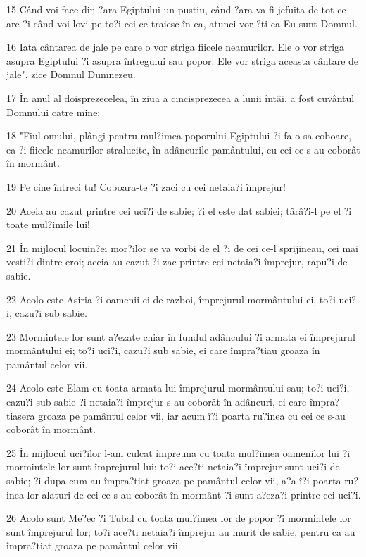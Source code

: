 \par 15 Când voi face din ?ara Egiptului un pustiu, când ?ara va fi jefuita de tot ce are ?i când voi lovi pe to?i cei ce traiesc în ea, atunci vor ?ti ca Eu sunt Domnul.
\par 16 Iata cântarea de jale pe care o vor striga fiicele neamurilor. Ele o vor striga asupra Egiptului ?i asupra întregului sau popor. Ele vor striga aceasta cântare de jale", zice Domnul Dumnezeu.
\par 17 În anul al doisprezecelea, în ziua a cincisprezecea a lunii întâi, a fost cuvântul Domnului catre mine:
\par 18 "Fiul omului, plângi pentru mul?imea poporului Egiptului ?i fa-o sa coboare, ea ?i fiicele neamurilor stralucite, în adâncurile pamântului, cu cei ce s-au coborât în mormânt.
\par 19 Pe cine întreci tu! Coboara-te ?i zaci cu cei netaia?i împrejur!
\par 20 Aceia au cazut printre cei uci?i de sabie; ?i el este dat sabiei; târâ?i-l pe el ?i toate mul?imile lui!
\par 21 În mijlocul locuin?ei mor?ilor se va vorbi de el ?i de cei ce-l sprijineau, cei mai vesti?i dintre eroi; aceia au cazut ?i zac printre cei netaia?i împrejur, rapu?i de sabie.
\par 22 Acolo este Asiria ?i oamenii ei de razboi, împrejurul mormântului ei, to?i uci?i, cazu?i sub sabie.
\par 23 Mormintele lor sunt a?ezate chiar în fundul adâncului ?i armata ei împrejurul mormântului ei; to?i uci?i, cazu?i sub sabie, ei care împra?tiau groaza în pamântul celor vii.
\par 24 Acolo este Elam cu toata armata lui împrejurul mormântului sau; to?i uci?i, cazu?i sub sabie ?i netaia?i împrejur s-au coborât în adâncuri, ei care împra?tiasera groaza pe pamântul celor vii, iar acum î?i poarta ru?inea cu cei ce s-au coborât în mormânt.
\par 25 În mijlocul uci?ilor l-am culcat împreuna cu toata mul?imea oamenilor lui ?i mormintele lor sunt împrejurul lui; to?i ace?ti netaia?i împrejur sunt uci?i de sabie; ?i dupa cum au împra?tiat groaza pe pamântul celor vii, a?a î?i poarta ru?inea lor alaturi de cei ce s-au coborât în mormânt ?i sunt a?eza?i printre cei uci?i.
\par 26 Acolo sunt Me?ec ?i Tubal cu toata mul?imea lor de popor ?i mormintele lor sunt împrejurul lor; to?i ace?ti netaia?i împrejur au murit de sabie, pentru ca au împra?tiat groaza pe pamântul celor vii.
